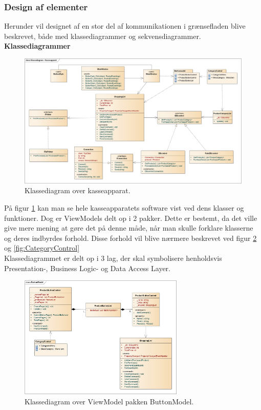 \subsubsection{Design af elementer}
Herunder vil designet af en stor del af kommunikationen i grænsefladen blive beskrevet, både med klassediagrammer og sekvensdiagrammer.\\

\textbf{Klassediagrammer}\\

\begin{figure}[H]
	\centering
	\includegraphics[width=1.2\textwidth, angle=90]{Systemdesign/Frontend/GUI/DesignOgStruktur/Pics/KlassediagramKasseApparat}
	\caption{Klassediagram over kasseapparat.}
	\label{fig:KasseKlasse}
\end{figure}

På figur \ref{fig:KasseKlasse} kan man se hele kasseapparatets software vist ved dens klasser og funktioner. Dog er ViewModels delt op i 2 pakker. Dette er bestemt, da det ville give mere mening at gøre det på denne måde, når man skulle forklare klasserne og deres indbyrdes forhold. Disse forhold vil blive nærmere beskrevet ved figur \ref{fig:ButtonModel} og \ref{fig:CategoryControl} \\
Klassediagrammet er delt op i 3 lag, der skal symbolisere henholdsvis Presentation-, Business Logic- og Data Access Layer.

\begin{figure}[H]
	\centering
	\includegraphics[width=0.7\textwidth]{Systemdesign/Frontend/GUI/DesignOgStruktur/Pics/KlassediagramButtonModel}
	\caption{Klassediagram over ViewModel pakken ButtonModel.}
	\label{fig:ButtonModel}
\end{figure}

